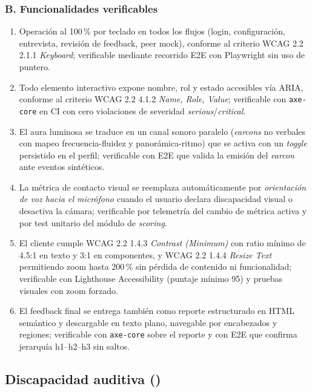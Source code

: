 \subsubsection*{B. Funcionalidades verificables}
\begin{enumerate}
  \item Operación al 100\,\% por teclado en todos los flujos
        (login, configuración, entrevista, revisión de feedback, peer
        mock), conforme al criterio WCAG 2.2 2.1.1 \textit{Keyboard};
        verificable mediante recorrido E2E con Playwright sin uso de
        puntero.
  \item Todo elemento interactivo expone nombre, rol y estado
        accesibles vía ARIA, conforme al criterio WCAG 2.2 4.1.2
        \textit{Name, Role, Value}; verificable con \texttt{axe-core}
        en CI con cero violaciones de severidad
        \textit{serious}/\textit{critical}.
  \item El aura luminosa se traduce en un canal sonoro paralelo
        (\textit{earcons} no verbales con mapeo frecuencia-fluidez y
        panorámica-ritmo) que se activa con un \textit{toggle}
        persistido en el perfil; verificable con E2E que valida la
        emisión del \textit{earcon} ante eventos sintéticos.
  \item La métrica de contacto visual se reemplaza automáticamente por
        \emph{orientación de voz hacia el micrófono} cuando el usuario
        declara discapacidad visual o desactiva la cámara; verificable
        por telemetría del cambio de métrica activa y por test
        unitario del módulo de \textit{scoring}.
  \item El cliente cumple WCAG 2.2 1.4.3 \textit{Contrast (Minimum)}
        con ratio mínimo de 4.5:1 en texto y 3:1 en componentes, y
        WCAG 2.2 1.4.4 \textit{Resize Text} permitiendo zoom hasta
        200\,\% sin pérdida de contenido ni funcionalidad; verificable
        con Lighthouse Accessibility (puntaje mínimo 95) y pruebas
        visuales con zoom forzado.
  \item El feedback final se entrega también como reporte estructurado
        en HTML semántico y descargable en texto plano, navegable por
        encabezados y regiones; verificable con \texttt{axe-core} sobre
        el reporte y con E2E que confirma jerarquía h1--h2--h3 sin
        saltos.
\end{enumerate}

\subsection{Discapacidad auditiva ()}

